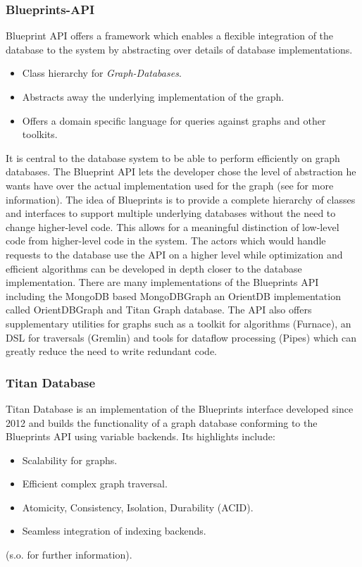 \documentclass[twoside, 11pt]{scrartcl}
\begin{document}
\subsubsection{Blueprints-API}
Blueprint API offers a framework which enables a flexible integration of the database to the system by abstracting over details of database implementations.

\begin{itemize}
	\item Class hierarchy for \textit{Graph-Databases}.
	\item Abstracts away the underlying implementation of the graph.
	\item Offers a domain specific language for queries against graphs and other toolkits.
\end{itemize}
 
It is central to the database system to be able to perform efficiently on graph databases. The Blueprint API lets the developer chose the level of abstraction he wants have over the actual implementation used for the graph (see \cite{link:blueprints} for more information). 
The idea of Blueprints is to provide a complete hierarchy of classes and interfaces to support multiple underlying databases without the need to change higher-level code. This allows for a meaningful distinction of low-level code from higher-level code in the system. The actors which would handle requests to the database use the API on a higher level while optimization and efficient algorithms can be developed in depth closer to the database implementation.
There are many implementations of the Blueprints API including the MongoDB based MongoDBGraph an OrientDB implementation called OrientDBGraph and Titan Graph database.
The API also offers supplementary utilities for graphs such as a toolkit for algorithms (Furnace), an DSL for traversals (Gremlin) and tools for dataflow processing (Pipes) which can greatly reduce the need to write redundant code.


\subsubsection{Titan Database}
Titan Database is an implementation of the Blueprints interface developed since 2012 and builds the functionality of a graph database conforming to the Blueprints API  using variable backends. Its highlights include:

\begin{itemize}
	\item Scalability for graphs.
	\item Efficient complex graph traversal.
	\item Atomicity, Consistency, Isolation, Durability (ACID).
	\item Seamless integration of indexing backends.
\end{itemize}
(s.o. \cite{link:titanHome} for further information).
\end{document}

